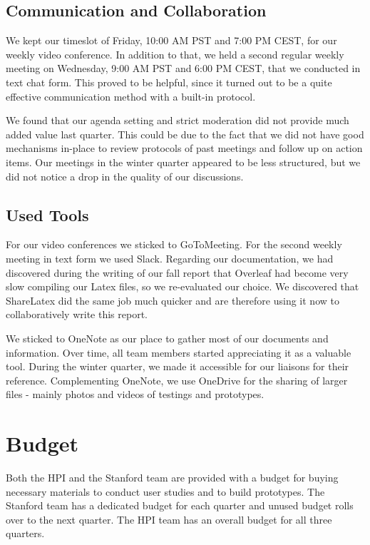\subsection{Communication and Collaboration}
We kept our timeslot of Friday, 10:00 AM PST and 7:00 PM CEST, for our weekly video conference. In addition to that, we held a second regular weekly meeting on Wednesday, 9:00 AM PST and 6:00 PM CEST, that we conducted in text chat form. This proved to be helpful, since it turned out to be a quite effective communication method with a built-in protocol.

We found that our agenda setting and strict moderation did not provide much added value last quarter. This could be due to the fact that we did not have good mechanisms in-place to review protocols of past meetings and follow up on action items. Our meetings in the winter quarter appeared to be less structured, but we did not notice a drop in the quality of our discussions.

\subsection{Used Tools}
For our video conferences we sticked to GoToMeeting. For the second weekly meeting in text form we used Slack. Regarding our documentation, we had discovered during the writing of our fall report that Overleaf had become very slow compiling our Latex files, so we re-evaluated our choice. We discovered that ShareLatex did the same job much quicker and are therefore using it now to collaboratively write this report.

We sticked to OneNote as our place to gather most of our documents and information. Over time, all team members started appreciating it as a valuable tool. During the winter quarter, we made it accessible for our liaisons for their reference. Complementing OneNote, we use OneDrive for the sharing of larger files - mainly photos and videos of testings and prototypes.
 
\section{Budget}
\label{sec:budget}

Both the HPI and the Stanford team are provided with a budget for buying necessary materials to conduct user studies and to build prototypes. The Stanford team has a dedicated budget for each quarter and unused budget rolls over to the next quarter. The HPI team has an overall budget for all three quarters.

